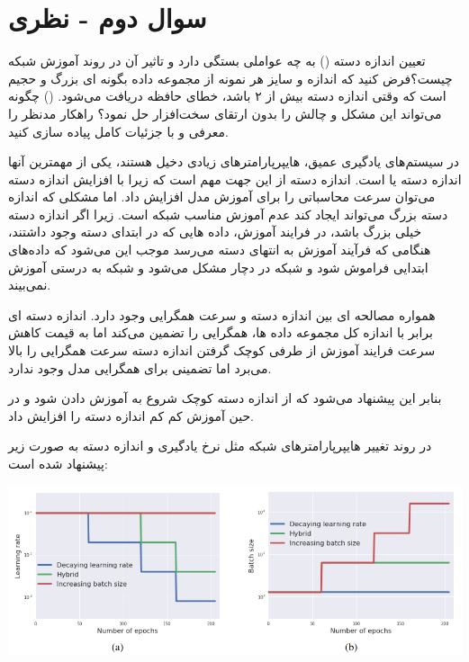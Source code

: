 \section{سوال دوم - نظری}
تعیین اندازه دسته () به چه عواملی بستگی دارد و تاثیر آن در روند آموزش شبکه چیست؟فرض کنید که اندازه و سایز هر نمونه از مجموعه داده بگونه ای بزرگ و حجیم است که وقتی اندازه دسته بیش از ۲ باشد، خطای حافظه دریافت می‌شود. () چگونه می‌تواند این مشکل و چالش را بدون ارتقای سخت‌افزار حل نمود؟ راهکار مدنظر را معرفی و با جزئیات کامل پیاده سازی کنید.







\begin{qsolve}
	در سیستم‌های یادگیری عمیق، هایپرپارامتر‌های زیادی دخیل هستند، یکی از مهمترین آنها اندازه دسته یا  است. \cite{ref1} اندازه دسته از این جهت مهم است که زیرا با افزایش اندازه دسته می‌توان سرعت محاسباتی را برای آموزش مدل افزایش داد. اما مشکلی که اندازه دسته بزرگ می‌تواند ایجاد کند عدم آموزش مناسب شبکه است. زیرا اگر اندازه دسته خیلی بزرگ باشد، در فرایند آموزش، داده هایی که در ابتدای دسته وجود داشتند، هنگامی که فرآیند آموزش به انتهای دسته می‌رسد موجب این می‌شود که داده‌های ابتدایی فراموش شود و شبکه در  دچار مشکل می‌شود و شبکه به درستی آموزش نمی‌بیند. \cite{ref2}
	
همواره مصالحه ای بین اندازه دسته و سرعت همگرایی وجود دارد. اندازه دسته ای برابر با اندازه کل مجموعه داده ها، همگرایی را تضمین می‌کند اما به قیمت کاهش سرعت فرایند آموزش از طرفی کوچک گرفتن اندازه دسته سرعت همگرایی را بالا می‌برد اما تضمینی برای همگرایی مدل وجود ندارد. \cite{ref2}

بنابر این پیشنهاد می‌شود که از اندازه دسته کوچک شروع به آموزش دادن شود و در حین آموزش کم کم اندازه دسته را افزایش داد. \cite{ref2}

در \cite{ref2} روند تغییر هایپرپارامترهای شبکه مثل نرخ یادگیری و اندازه دسته به صورت زیر پیشنهاد شده است:

\begin{center}
	\includegraphics*[width=1\linewidth]{pics/img6.png}
	\label{روند تغییر پویا هایپرپارامترهای مهم شبکه}
\end{center}


\end{qsolve}
